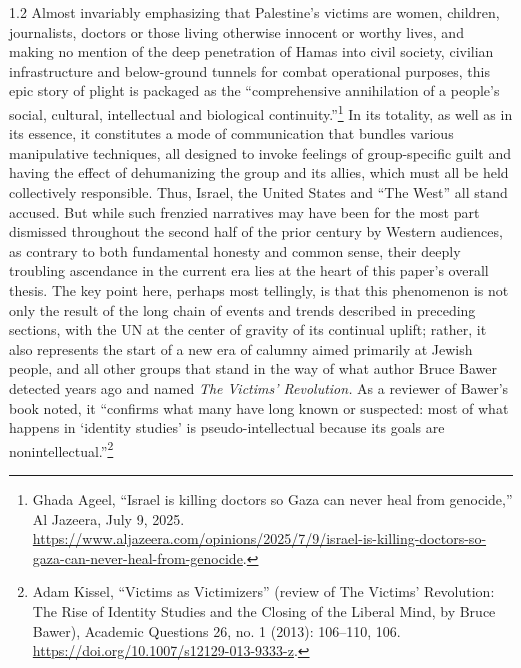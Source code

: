 \documentclass[../unravbook.tex]{subfiles}
\begin{document}
\begin{spacing}{1.2}
Almost invariably emphasizing that Palestine's victims are women, children, journalists, doctors or those living otherwise innocent or worthy lives, and making no mention of the deep penetration of Hamas into civil society, civilian infrastructure and below-ground tunnels for combat operational purposes, this epic story of plight is packaged as the \enquote{comprehensive annihilation of a people's social, cultural, intellectual and biological continuity.}\footnote{Ghada Ageel, \enquote{Israel is killing doctors so Gaza can never heal from genocide,} Al Jazeera, July 9, 2025. \url{https://www.aljazeera.com/opinions/2025/7/9/israel-is-killing-doctors-so-gaza-can-never-heal-from-genocide}.} In its totality, as well as in its essence, it constitutes a mode of communication that bundles various manipulative techniques, all designed to invoke feelings of group-specific guilt and having the effect of dehumanizing the group and its allies, which must all be held collectively responsible. Thus, Israel, the United States and \enquote{The West} all stand accused. But while such frenzied narratives may have been for the most part dismissed throughout the second half of the prior century by Western audiences, as contrary to both fundamental honesty and common sense, their deeply troubling ascendance in the current era lies at the heart of this paper's overall thesis. The key point here, perhaps most tellingly, is that this phenomenon is not only the result of the long chain of events and trends described in preceding sections, with the UN at the center of gravity of its continual uplift; rather, it also represents the start of a new era of calumny aimed primarily at Jewish people, and all other groups that stand in the way of what author Bruce Bawer detected years ago and named \textit{The Victims' Revolution.} As a reviewer of Bawer's book noted, it \enquote{confirms what many have long known or suspected: most of what happens in \enquote{identity studies} is pseudo-intellectual because its goals are nonintellectual.}\footnote{Adam Kissel, \enquote{Victims as Victimizers} (review of The Victims' Revolution: The Rise of Identity Studies and the Closing of the Liberal Mind, by Bruce Bawer), Academic Questions 26, no. 1 (2013): 106--110, 106. \url{https://doi.org/10.1007/s12129-013-9333-z}.} 


\end{spacing}
\end{document}
